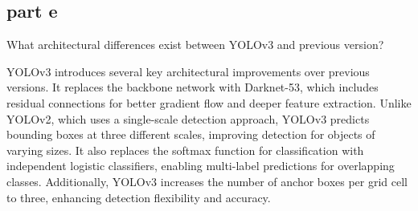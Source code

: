 \subsection{part e}
What architectural differences exist between YOLOv3 and previous version?
    \begin{qsolve}
      \begin{qsolve}[]
        YOLOv3 introduces several key architectural improvements over previous versions. It replaces the backbone network with Darknet-53, which includes residual connections for better gradient flow and deeper feature extraction. Unlike YOLOv2, which uses a single-scale detection approach, YOLOv3 predicts bounding boxes at three different scales, improving detection for objects of varying sizes. It also replaces the softmax function for classification with independent logistic classifiers, enabling multi-label predictions for overlapping classes. Additionally, YOLOv3 increases the number of anchor boxes per grid cell to three, enhancing detection flexibility and accuracy.

      \end{qsolve}
    \end{qsolve}
